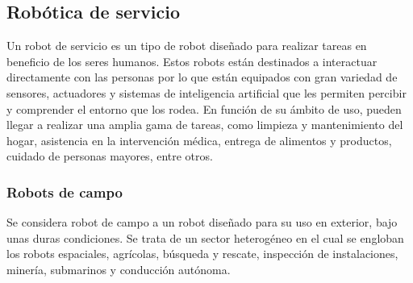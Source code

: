 \subsection{Robótica de servicio}
Un robot de servicio es un tipo de robot diseñado para realizar tareas en beneficio de los seres humanos. Estos robots están 
destinados a interactuar directamente con las personas por lo que están equipados con gran variedad de sensores, actuadores y sistemas de 
inteligencia artificial que les permiten percibir y comprender el entorno que los rodea. 
En función de su ámbito de uso, pueden llegar a realizar una amplia gama de tareas, como limpieza y mantenimiento del hogar, 
asistencia en la intervención médica, entrega de alimentos y productos, cuidado de personas mayores, entre otros.

\subsubsection{Robots de campo}
Se considera robot de campo a un robot diseñado para su uso en exterior, bajo unas duras condiciones. Se trata de un sector heterogéneo en el cual se engloban los 
robots espaciales, agrícolas, búsqueda y rescate, inspección de instalaciones, minería, submarinos y conducción autónoma.
